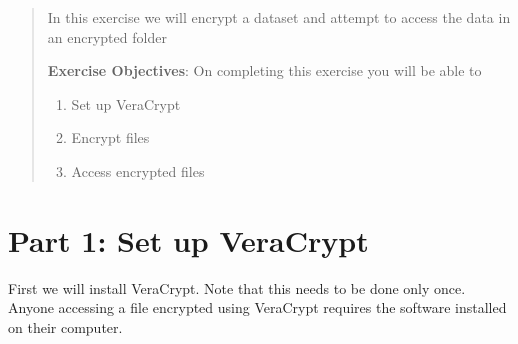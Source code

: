 \documentclass{tufte-handout}
\begin{document}
\begin{abstract}
In this exercise we will encrypt a dataset and attempt to access the data in an encrypted folder

\bigskip\noindent \textbf{Exercise Objectives}: On completing this exercise you will be able to
\begin{enumerate}
  \item Set up VeraCrypt
  \item Encrypt files
  \item Access encrypted files
\end{enumerate}
\end{abstract}

\section{Part 1: Set up VeraCrypt}

First we will install VeraCrypt. Note that this needs to be done only once. Anyone accessing a file encrypted using VeraCrypt requires the software installed on their computer.
\end{document}
